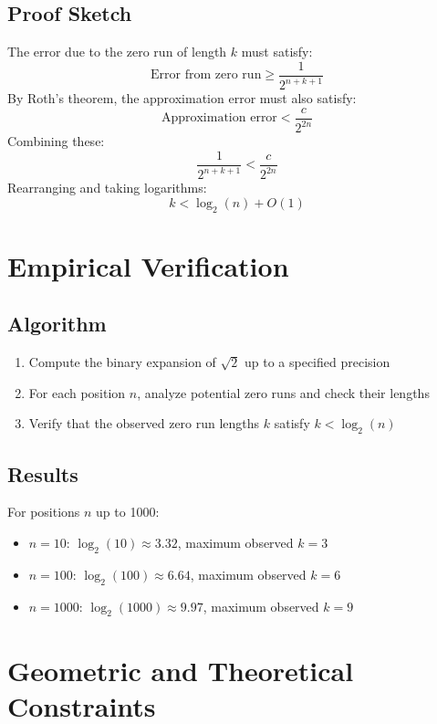 \subsection{Proof Sketch}
The error due to the zero run of length $k$ must satisfy:
\begin{equation}
\text{Error from zero run} \geq \frac{1}{2^{n+k+1}}
\end{equation}
By Roth's theorem, the approximation error must also satisfy:
\begin{equation}
\text{Approximation error} < \frac{c}{2^{2n}}
\end{equation}
Combining these:
\begin{equation}
\frac{1}{2^{n+k+1}} < \frac{c}{2^{2n}}
\end{equation}
Rearranging and taking logarithms:
\begin{equation}
k < \log_2(n) + O(1)
\end{equation}
\section{Empirical Verification}
\subsection{Algorithm}
\begin{enumerate}
\item Compute the binary expansion of $\sqrt{2}$ up to a specified precision
\item For each position $n$, analyze potential zero runs and check their lengths
\item Verify that the observed zero run lengths $k$ satisfy $k < \log_2(n)$
\end{enumerate}
\subsection{Results}
For positions $n$ up to 1000:
\begin{itemize}
\item $n = 10$: $\log_2(10) \approx 3.32$, maximum observed $k = 3$
\item $n = 100$: $\log_2(100) \approx 6.64$, maximum observed $k = 6$
\item $n = 1000$: $\log_2(1000) \approx 9.97$, maximum observed $k = 9$
\end{itemize}
\section{Geometric and Theoretical Constraints}
